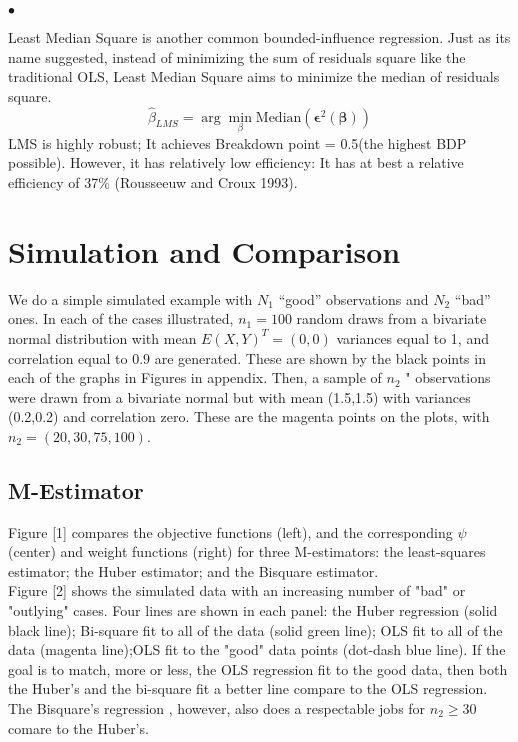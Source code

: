 \documentclass[conference]{IEEEtran}
\begin{document}
\noindent $\bullet$ 

Least Median Square is another common bounded-influence regression. Just as its name suggested, instead of minimizing the sum of residuals square like the traditional OLS, Least Median Square aims to minimize the median of residuals square.
$$ \hat{\beta}_{LMS}=\arg \min_{\beta} \text{Median}( \mathbold{\epsilon}^2(\mathbold{\beta}))$$
LMS is highly robust; It achieves Breakdown point = 0.5(the highest BDP possible). However, it has relatively low efficiency: It has at best a relative efficiency of 37\% (Rousseeuw and Croux 1993).



\section{Simulation and Comparison}
We do a simple simulated example with $N_1$ “good” observations and $N_2$
“bad” ones. In each of the
 cases illustrated, $n_1 = 100$ random draws from a bivariate normal distribution with mean
$E(X, Y )^T = (0, 0)$ variances equal to 1, and correlation equal to $0.9$ are generated. These are shown
by the black points in each of the graphs in Figures in appendix. Then, a sample of $n_2$ \bad" observations were
drawn from a bivariate normal but with mean (1.5,1.5) with variances (0.2,0.2) and correlation zero. These are the magenta points on the plots, with $n_2= (20, 30, 75, 100)$.\\
\subsection{M-Estimator}
Figure [1] compares the objective functions (left), and the corresponding $\psi$ (center) and weight functions (right) for three
M-estimators: the  least-squares estimator; the Huber estimator; and the Bisquare estimator.\\

Figure [2] shows the simulated data with an increasing number of "bad" or "outlying" cases. Four lines are shown in each panel: the Huber regression (solid black line); Bi-square fit to all of the data (solid green line); OLS fit to all of the data  (magenta line);OLS fit to  the "good" data points (dot-dash blue line). If the goal is to match, more or less, the OLS regression fit to the good data, then both the Huber's and the bi-square fit a better line compare to the OLS regression. The Bisquare's regression , however, also does a respectable jobs for $n_2 \geq 30$ comare to the Huber's.
\end{document}
